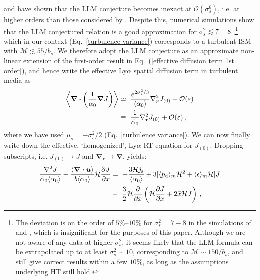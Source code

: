 \documentclass[fleqn,usenatbib]{mnras}
\begin{document}
\cite{Abramovich1995} and \cite{DeWit1995} have shown that the LLM conjecture becomes inexact at $\mathcal{O}(\sigma_s^6)$, i.e. at higher orders than those considered by \cite{Dagan1993}. Despite this, numerical simulations show that the LLM conjectured relation is a good approximation for $\sigma_s^2 \lesssim 7-8$ \citep{Dykaar1992, Neuman1993, Jankovic2017},\footnote{The deviation is on the order of $5\%$--$10\%$ for $\sigma_s^2 = 7-8$ in the simulations of \cite{Neuman1993} and \cite{Jankovic2017}, which is insignificant for the purposes of this paper. Although we are not aware of any data at higher $\sigma_s^2$, it seems likely that the LLM formula can be extrapolated up to at least $\sigma_s^2 \sim 10$, corresponding to $\mathcal{M} \sim 150/b_s$, and still give correct results within a few $10\%$, as long as the assumptions underlying HT still hold.} which in our context (Eq.~\ref{turbulence variance}) corresponds to a turbulent ISM with $\mathcal{M} \lesssim 55/b_s$.  We therefore adopt the LLM conjecture as an approximate non-linear extension of the first-order result in Eq.~(\ref{effective diffusion term 1st order}), and hence write the effective Ly$\alpha$ spatial diffusion term in turbulent media as
\begin{align}
     \left\langle \boldsymbol{\nabla} \boldsymbol{\cdot} \left( \dfrac{1}{\alpha_0}  \boldsymbol{\nabla} J  \right) \right\rangle &\simeq~ \dfrac{e^{2 \sigma_s^2 /3}}{\langle \alpha_0 \rangle}  \nabla_{\boldsymbol{r}}^2 J_{(0)} + \mathcal{O}(\varepsilon) \label{effective diffusion term final} \\ &\equiv~  \dfrac{1}{\Tilde{\alpha}_0} \nabla_{\boldsymbol{r}}^2 J_{(0)} + \mathcal{O}(\varepsilon) \, \nonumber ,
\end{align}
where we have used $\mu_s = - \sigma_s^2 /2$ (Eq.~\ref{turbulence variance}). We can now finally write down the effective, `homogenized', Ly$\alpha$ RT equation for $J_{(0)}$. Dropping subscripts, i.e. $J_{(0)} \rightarrow J$ and $\boldsymbol{\nabla}_{\boldsymbol{r}} \rightarrow \boldsymbol{\nabla}$, yields:
\begin{align}
     \dfrac{\nabla^2 J}{\Tilde{\alpha}_0 \langle \alpha_0 \rangle }   + \dfrac{\langle\boldsymbol{\nabla \cdot u}\rangle}{b \langle \alpha_0 \rangle } \mathcal{H} \dfrac{\partial J}{\partial x} &=~ -\dfrac{3 \mathcal{H} j_{\rm s}}{\langle \alpha_0 \rangle} + 3 [ \langle p_{\rm d} \rangle_{m} \mathcal{H}^2 + \langle \epsilon \rangle_{m} \mathcal{H}] J \nonumber \\ &-~ \dfrac{3}{2} \mathcal{H}  \dfrac{\partial}{\partial x} \left(  \mathcal{H} \dfrac{\partial J}{\partial x} +  2 \Bar{x} \mathcal{H} J \right) \, \label{homogenized Lya RT eq}, 
\end{align}
\end{document}
